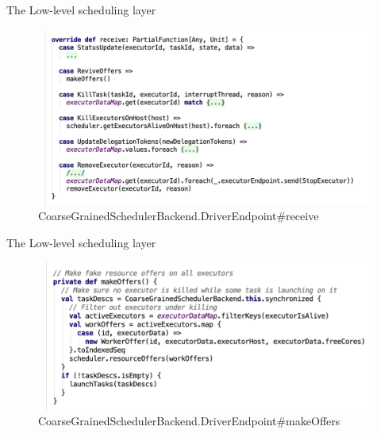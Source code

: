 \begin{frame}[plain,t]{The Low-level scheduling layer} %
	 \\  \vspace{2ex}
	\begin{figure}
		\centering
		\includegraphics[width=0.9\linewidth]{images/backend002}
		\caption{CoarseGrainedSchedulerBackend.DriverEndpoint\#receive}
		\label{fig:backend002}
	\end{figure}
	
\end{frame}
\begin{frame}[plain,t]{The Low-level scheduling layer} %
	 \\  \vspace{2ex}
	\begin{figure}
		\centering
		\includegraphics[width=0.9\linewidth]{images/backend003}
		\caption{CoarseGrainedSchedulerBackend.DriverEndpoint\#makeOffers}
		\label{fig:backend003}
	\end{figure}
	
\end{frame}





